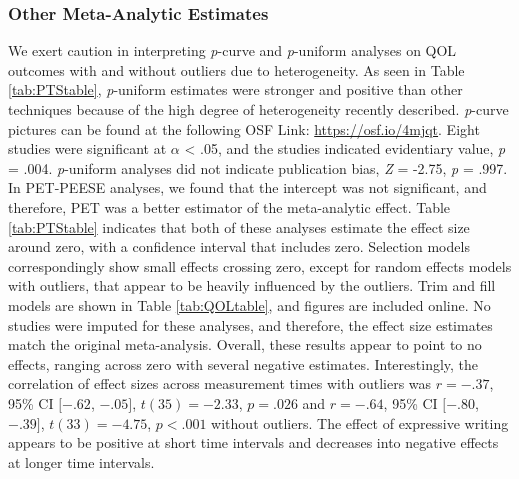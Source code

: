 \documentclass[english,man, mask]{apa6}
\theoremstyle{definition}
\theoremstyle{definition}
\theoremstyle{definition}
\theoremstyle{remark}
\begin{document}
\subsubsection{Other Meta-Analytic
Estimates}\label{other-meta-analytic-estimates-2}

We exert caution in interpreting \emph{p}-curve and \emph{p}-uniform
analyses on QOL outcomes with and without outliers due to heterogeneity.
As seen in Table \ref{tab:PTStable}, \emph{p}-uniform estimates were
stronger and positive than other techniques because of the high degree
of heterogeneity recently described. \emph{p}-curve pictures can be
found at the following OSF Link: \url{https://osf.io/4mjqt}. Eight
studies were significant at \(\alpha\) \textless{} .05, and the studies
indicated evidentiary value, \emph{p} = .004. \emph{p}-uniform analyses
did not indicate publication bias, \emph{Z} = -2.75, \emph{p} = .997. In
PET-PEESE analyses, we found that the intercept was not significant, and
therefore, PET was a better estimator of the meta-analytic effect. Table
\ref{tab:PTStable} indicates that both of these analyses estimate the
effect size around zero, with a confidence interval that includes zero.
Selection models correspondingly show small effects crossing zero,
except for random effects models with outliers, that appear to be
heavily influenced by the outliers. Trim and fill models are shown in
Table \ref{tab:QOLtable}, and figures are included online. No studies
were imputed for these analyses, and therefore, the effect size
estimates match the original meta-analysis. Overall, these results
appear to point to no effects, ranging across zero with several negative
estimates. Interestingly, the correlation of effect sizes across
measurement times with outliers was \(r = -.37\), 95\% CI \([-.62\),
\(-.05]\), \(t(35) = -2.33\), \(p = .026\) and \(r = -.64\), 95\% CI
\([-.80\), \(-.39]\), \(t(33) = -4.75\), \(p < .001\) without outliers.
The effect of expressive writing appears to be positive at short time
intervals and decreases into negative effects at longer time intervals.
\end{document}
